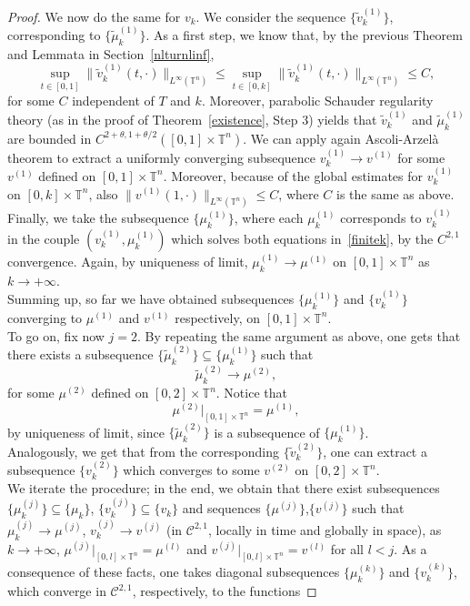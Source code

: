 \documentclass[10pt,a4paper,nouppercase,nowrite]{article}
\numberwithin{equation}{section}
\newcommand{\T}{\mathbb{T}}
\theoremstyle{definition}
\begin{document}
\begin{proof}
	We now do the same for $v_k$. We consider the sequence $\{ \tilde v_k^{(1)} \}$, corresponding to $\{ \tilde \mu_k^{(1)} \}$. As a first step, we know that, by the previous Theorem and Lemmata in Section~\ref{nlturnlinf}, 
	$$\sup_{t \in [0,1]} \| \tilde v_k^{(1)}(t,\cdot) \|_{L^{\infty}(\T^n)} \le \sup_{t \in [0,k]} \| \tilde v_k^{(1)}(t,\cdot) \|_{L^{\infty}(\T^n)} \le C,$$
	for some $C$ independent of $T$ and $k$. Moreover, parabolic Schauder regularity theory (as in the proof of Theorem~\ref{existence}, Step 3) yields that $\tilde v_k^{(1)}$ and $\tilde \mu_k^{(1)}$ are bounded in $C^{2+\theta, 1+\theta/2}([0,1] \times \T^n)$. We can apply again Ascoli-Arzelà theorem to extract a uniformly converging subsequence $v_k^{(1)} \to v^{(1)}$ for some $v^{(1)}$ defined on $[0,1] \times \T^n$.  Moreover, because of the global estimates for $v_k^{(1)}$ on $[0,k] \times \T^n$, also $\| v^{(1)}(1,\cdot) \|_{L^{\infty}(\T^n)} \le C$, where $C$ is the same as above.
	Finally, we take the subsequence $\{ \mu_k^{(1)} \}$, where each $\mu_k^{(1)}$ corresponds to $v_k^{(1)}$ in the couple $(v_k^{(1)},\mu_k^{(1)})$ which solves both equations in~\eqref{finitek}, by the $C^{2,1}$ convergence. Again, by uniqueness of limit, $\mu_k^{(1)} \to \mu^{(1)}$ on $[0,1] \times \T^n$ as $k \to +\infty$. \\
	Summing up, so far we have obtained subsequences $\{ \mu_k^{(1)} \}$ and $\{ v_k^{(1)} \}$ converging to $\mu^{(1)}$ and $v^{(1)}$ respectively, on $[0,1] \times \T^n$. \\
	To go on, fix now $j=2$. By repeating the same argument as above, one gets that there exists a subsequence $\{ \tilde \mu_k^{(2)} \} \subseteq \{ \mu_k^{(1)} \}$ such that
	$$\tilde \mu_k^{(2)} \to \mu^{(2)},$$
	for some $\mu^{(2)}$ defined on $[0,2] \times \T^n$. Notice that
	$$\mu^{(2)} \big|_{[0,1] \times \T^n} = \mu^{(1)},$$
	by uniqueness of limit, since $\{ \tilde \mu_k^{(2)} \}$ is a subsequence of $\{ \mu_k^{(1)} \}$. \\
	Analogously, we get that from the corresponding $\{ \tilde v_k^{(2)} \}$, one can extract a subsequence $\{ v_k^{(2)} \}$ which converges to some $v^{(2)}$ on $[0,2] \times \T^n$. \\
	We iterate the procedure; in the end, we obtain that there exist subsequences $\{ \mu_k^{(j)} \} \subseteq \{ \mu_k \}$, $\{ v_k^{(j)} \} \subseteq \{ v_k \}$ and sequences $\{ \mu^{(j)} \}$,$\{ v^{(j)} \}$ such that $\mu_k^{(j)} \to \mu^{(j)}$, $v_k^{(j)} \to v^{(j)}$ (in $\mathcal{C}^{2,1}$, locally in time and globally in space), as $k \to +\infty$, $\mu^{(j)} \big|_{[0,l] \times \T^n} = \mu^{(l)}$ and $v^{(j)} \big|_{[0,l] \times \T^n} = v^{(l)}$ for all $l < j$. As a consequence of these facts, one takes diagonal subsequences $\{ \mu^{(k)}_k \}$ and $\{ v^{(k)}_k \}$, which converge in $\mathcal{C}^{2,1}$, respectively, to the functions

\end{proof}
\end{document}
